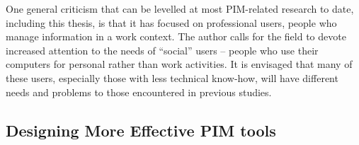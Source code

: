 



One general criticism that can be levelled at most PIM-related research to date, including this thesis, is that it has focused on professional users, people who manage information in a work context. The author calls for the field to devote increased attention to the needs of ``social'' users -- people who use their computers for personal rather than work activities.  It is envisaged that many of these users, especially those with less technical know-how, will have different needs and problems to those encountered in previous studies.  %






		
\subsection{Designing More Effective PIM tools}
\label{conclusion:future-work-design}

